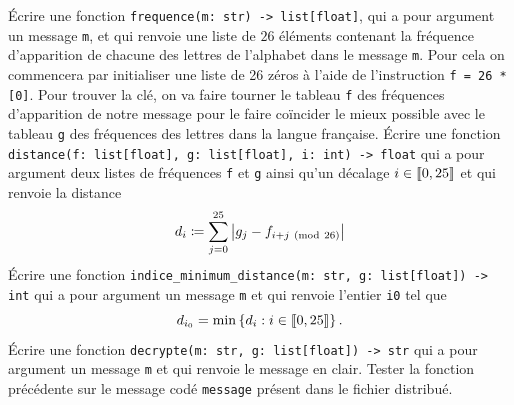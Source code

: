 \documentclass{magnolia}
\begin{document}
\begin{questions}
\question Écrire une fonction \verb_frequence(m: str) -> list[float]_, qui a pour argument
  un message \verb_m_, et qui renvoie une liste de $26$ éléments contenant la fréquence 
	d'apparition de chacune des lettres de l'alphabet dans le message \verb_m_. Pour cela
	on commencera par initialiser une liste de 26 zéros à l'aide de l'instruction
	\verb_f = 26 * [0]_.
\enonce Pour trouver la clé, on va faire \og tourner \fg le tableau \verb_f_ des fréquences
  d'apparition de notre message pour le faire coïncider le mieux possible avec le tableau
	\verb_g_ des fréquences des lettres dans la langue française. 
\question Écrire une fonction \verb_distance(f: list[float], g: list[float], i: int) -> float_
  qui a pour argument deux listes de fréquences \verb_f_ et \verb_g_ ainsi qu'un décalage
	$i\in\left\llbracket 0,25\right\rrbracket$ et qui renvoie la distance
  \[d_i\coloneqq \sum_{j=0}^{25}\left|g_j-f_{i+j\ ({\rm mod}\ 26)}\right|\]
\question Écrire une fonction \verb!indice_minimum_distance(m: str, g: list[float]) -> int!
  qui a pour argument un message \verb_m_ et qui renvoie l'entier  \verb_i0_ tel que
	\[d_{i_0}=\min\left\{d_i : i\in\left\llbracket 0,25\right\rrbracket\right\}.\]
\question Écrire une fonction \verb!decrypte(m: str, g: list[float]) -> str! qui a pour
  argument un message \verb_m_ et qui renvoie le message en clair.
\question Tester la fonction précédente sur le message codé
  \verb_message_ présent dans le fichier distribué.
\end{questions}

%
%
%
%
%
\end{document}
